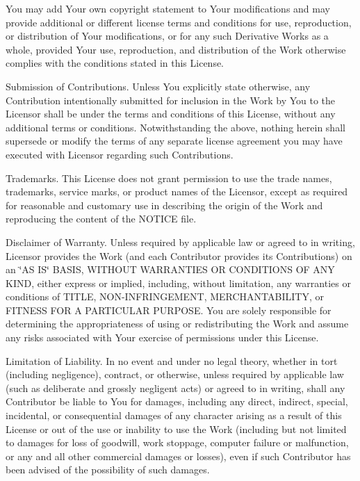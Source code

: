 \begin{DoxyEnumerate}
You may add Your own copyright statement to Your modifications and may provide additional or different license terms and conditions for use, reproduction, or distribution of Your modifications, or for any such Derivative Works as a whole, provided Your use, reproduction, and distribution of the Work otherwise complies with the conditions stated in this License.
\item Submission of Contributions. Unless You explicitly state otherwise, any Contribution intentionally submitted for inclusion in the Work by You to the Licensor shall be under the terms and conditions of this License, without any additional terms or conditions. Notwithstanding the above, nothing herein shall supersede or modify the terms of any separate license agreement you may have executed with Licensor regarding such Contributions.
\item Trademarks. This License does not grant permission to use the trade names, trademarks, service marks, or product names of the Licensor, except as required for reasonable and customary use in describing the origin of the Work and reproducing the content of the N\+O\+T\+I\+CE file.
\item Disclaimer of Warranty. Unless required by applicable law or agreed to in writing, Licensor provides the Work (and each Contributor provides its Contributions) on an \char`\"{}\+A\+S I\+S\char`\"{} B\+A\+S\+IS, W\+I\+T\+H\+O\+UT W\+A\+R\+R\+A\+N\+T\+I\+ES OR C\+O\+N\+D\+I\+T\+I\+O\+NS OF A\+NY K\+I\+ND, either express or implied, including, without limitation, any warranties or conditions of T\+I\+T\+LE, N\+O\+N-\/\+I\+N\+F\+R\+I\+N\+G\+E\+M\+E\+NT, M\+E\+R\+C\+H\+A\+N\+T\+A\+B\+I\+L\+I\+TY, or F\+I\+T\+N\+E\+SS F\+OR A P\+A\+R\+T\+I\+C\+U\+L\+AR P\+U\+R\+P\+O\+SE. You are solely responsible for determining the appropriateness of using or redistributing the Work and assume any risks associated with Your exercise of permissions under this License.
\item Limitation of Liability. In no event and under no legal theory, whether in tort (including negligence), contract, or otherwise, unless required by applicable law (such as deliberate and grossly negligent acts) or agreed to in writing, shall any Contributor be liable to You for damages, including any direct, indirect, special, incidental, or consequential damages of any character arising as a result of this License or out of the use or inability to use the Work (including but not limited to damages for loss of goodwill, work stoppage, computer failure or malfunction, or any and all other commercial damages or losses), even if such Contributor has been advised of the possibility of such damages.

\end{DoxyEnumerate}
